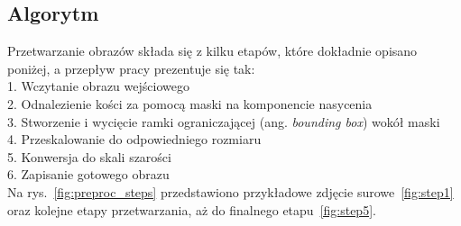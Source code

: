 \subsection{Algorytm}\label{subsec:algorytm}

Przetwarzanie obrazów składa się z kilku etapów, które dokładnie opisano poniżej, a przepływ pracy prezentuje się tak: \\
1. Wczytanie obrazu wejściowego \\
2. Odnalezienie kości za pomocą maski na komponencie nasycenia \\
3. Stworzenie i wycięcie ramki ograniczającej (ang. \textit{bounding box}) wokół maski \\
4. Przeskalowanie do odpowiedniego rozmiaru \\
5. Konwersja do skali szarości \\
6. Zapisanie gotowego obrazu \\


Na rys.~\ref{fig:preproc_steps} przedstawiono przykładowe zdjęcie surowe~\ref{fig:step1}
oraz kolejne etapy przetwarzania, aż do finalnego etapu~\ref{fig:step5}.

